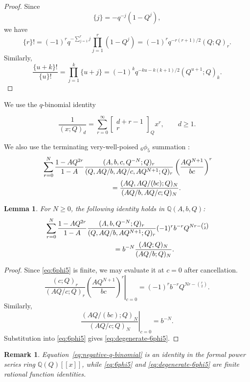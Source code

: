 \documentclass[11pt]{amsart}
\newtheorem{lemma}[theorem]{Lemma}
\newtheorem{remark}[theorem]{Remark}
\newcommand{\Q}{\mathbb Q}
\newcommand{\Gauss}[2]{\begin{bmatrix}#1\\#2\end{bmatrix}_{Q}}
\begin{document}
\begin{proof}
Since
\[
\{j\}=-q^{-j}(1-Q^j),
\]
we have
\[
\{r\}!
=
(-1)^r q^{-\sum_{j=1}^r j}
\prod_{j=1}^r(1-Q^j)
=
(-1)^r q^{-r(r+1)/2}(Q;Q)_r.
\]
Similarly,
\[
\frac{\{u+k\}!}{\{u\}!}
=
\prod_{j=1}^k\{u+j\}
=
(-1)^k
q^{-ku-k(k+1)/2}
(Q^{u+1};Q)_k.
\]
\end{proof}


We use the \(q\)-binomial identity \cite{GasperRahman}

\begin{equation}\label{eq:negative-q-binomial}
\frac{1}{(x;Q)_d}
=
\sum_{r=0}^{\infty}
\Gauss{d+r-1}{r}
x^r,
\qquad d\geq1.
\end{equation}

We also use the terminating very-well-poised \({}_6\phi_5\) summation \cite{GasperRahman}:
\begin{align}
&\sum_{r=0}^{N}
\frac{1-AQ^{2r}}{1-A}
\frac{
(A,b,c,Q^{-N};Q)_r
}{
(Q,AQ/b,AQ/c,AQ^{N+1};Q)_r
}
\left(
\frac{AQ^{N+1}}{bc}
\right)^r
\nonumber\\
&\hspace{35mm}
=
\frac{
(AQ,AQ/(bc);Q)_N
}{
(AQ/b,AQ/c;Q)_N
}.
\label{eq:6phi5}
\end{align}

\begin{lemma}
\label{lem:degenerate-6phi5}
For \(N\geq0\), the following identity holds in
\(\Q(A,b,Q)\):
\begin{align}
&\sum_{r=0}^{N}
\frac{1-AQ^{2r}}{1-A}
\frac{(A,b,Q^{-N};Q)_r}
{(Q,AQ/b,AQ^{N+1};Q)_r}
(-1)^r b^{-r}Q^{Nr-\binom r2}
\nonumber\\
&\hspace{35mm}
=
b^{-N}
\frac{(AQ;Q)_N}{(AQ/b;Q)_N}.
\label{eq:degenerate-6phi5}
\end{align}
\end{lemma}

\begin{proof}
Since \eqref{eq:6phi5} is finite, we may evaluate it at \(c=0\) after cancellation.
\[
\left.
\frac{(c;Q)_r}{(AQ/c;Q)_r}
\left(\frac{AQ^{N+1}}{bc}\right)^r
\right|_{c=0}
=
(-1)^r b^{-r}Q^{Nr-\binom r2}.
\]
Similarly,
\[
\left.
\frac{(AQ/(bc);Q)_N}{(AQ/c;Q)_N}
\right|_{c=0}
=
b^{-N}.
\]
Substitution into \eqref{eq:6phi5} gives
\eqref{eq:degenerate-6phi5}.
\end{proof}

\begin{remark}
Equation~\eqref{eq:negative-q-binomial} is an identity in the formal
power series ring \(\Q(Q)[[x]]\), while \eqref{eq:6phi5} and
\eqref{eq:degenerate-6phi5} are finite rational function identities.
\end{remark}
\end{document}
